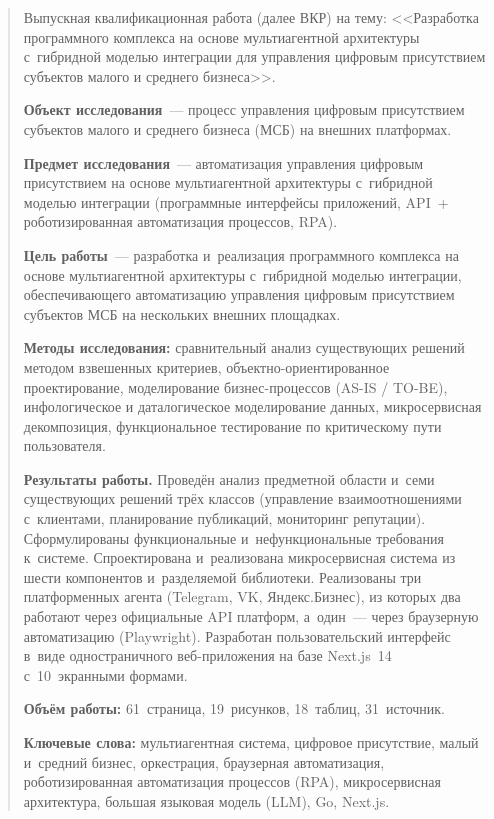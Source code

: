 \begin{abstract}
\thispagestyle{empty}

Выпускная квалификационная работа (далее ВКР) на тему: <<Разработка программного комплекса на основе мультиагентной архитектуры с~гибридной моделью интеграции для управления цифровым присутствием субъектов малого и среднего бизнеса>>.

\textbf{Объект исследования}~--- процесс управления цифровым присутствием субъектов малого и среднего бизнеса (МСБ) на внешних платформах.

\textbf{Предмет исследования}~--- автоматизация управления цифровым присутствием на основе мультиагентной архитектуры с~гибридной моделью интеграции (программные интерфейсы приложений, API~+ роботизированная автоматизация процессов, RPA).

\textbf{Цель работы}~--- разработка и~реализация программного комплекса на основе мультиагентной архитектуры с~гибридной моделью интеграции, обеспечивающего автоматизацию управления цифровым присутствием субъектов МСБ на нескольких внешних площадках.

\textbf{Методы исследования:} сравнительный анализ существующих решений методом взвешенных критериев, объектно-ориентированное проектирование, моделирование бизнес-процессов (AS-IS / TO-BE), инфологическое и даталогическое моделирование данных, микросервисная декомпозиция, функциональное тестирование по критическому пути пользователя.

\textbf{Результаты работы.} Проведён анализ предметной области и~семи существующих решений трёх классов (управление взаимоотношениями с~клиентами, планирование публикаций, мониторинг репутации). Сформулированы функциональные и~нефункциональные требования к~системе. Спроектирована и~реализована микросервисная система из шести компонентов и~разделяемой библиотеки. Реализованы три платформенных агента (Telegram, VK, Яндекс.Бизнес), из которых два работают через официальные API платформ, а~один~--- через браузерную автоматизацию (Playwright). Разработан пользовательский интерфейс в~виде одностраничного веб-приложения на базе Next.js~14 с~10~экранными формами.

\textbf{Объём работы:} 61~страница, 19~рисунков, 18~таблиц, 31~источник.

\textbf{Ключевые слова:} мультиагентная система, цифровое присутствие, малый и~средний бизнес, оркестрация, браузерная автоматизация, роботизированная автоматизация процессов (RPA), микросервисная архитектура, большая языковая модель (LLM), Go, Next.js.

\end{abstract}
